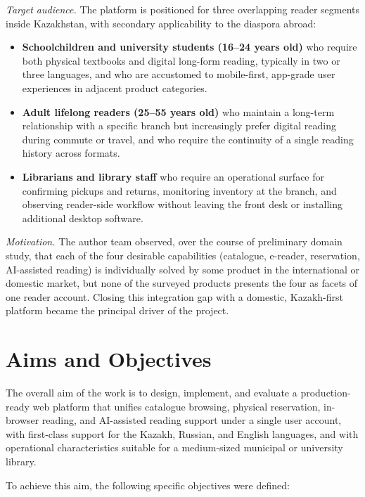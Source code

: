 \documentclass[12pt,a4paper]{report}
\begin{document}
\medskip
\noindent\textit{Target audience.} The platform is positioned for three
overlapping reader segments inside Kazakhstan, with secondary applicability
to the diaspora abroad:

\begin{itemize}[leftmargin=*]
    \item \textbf{Schoolchildren and university students (16--24 years old)}
    who require both physical textbooks and digital long-form reading,
    typically in two or three languages, and who are accustomed to
    mobile-first, app-grade user experiences in adjacent product categories.
    \item \textbf{Adult lifelong readers (25--55 years old)} who maintain a
    long-term relationship with a specific branch but increasingly prefer
    digital reading during commute or travel, and who require the
    continuity of a single reading history across formats.
    \item \textbf{Librarians and library staff} who require an operational
    surface for confirming pickups and returns, monitoring inventory at
    the branch, and observing reader-side workflow without leaving the
    front desk or installing additional desktop software.
\end{itemize}

\noindent\textit{Motivation.} The author team observed, over the course of
preliminary domain study, that each of the four desirable capabilities
(catalogue, e-reader, reservation, AI-assisted reading) is individually
solved by some product in the international or domestic market, but none
of the surveyed products presents the four as facets of one reader account.
Closing this integration gap with a domestic, Kazakh-first platform
became the principal driver of the project.

\section{Aims and Objectives}

The overall aim of the work is to design, implement, and evaluate a
production-ready web platform that unifies catalogue browsing, physical
reservation, in-browser reading, and AI-assisted reading support under a
single user account, with first-class support for the Kazakh, Russian, and
English languages, and with operational characteristics suitable for a
medium-sized municipal or university library.

\noindent
To achieve this aim, the following specific objectives were defined:
\end{document}
